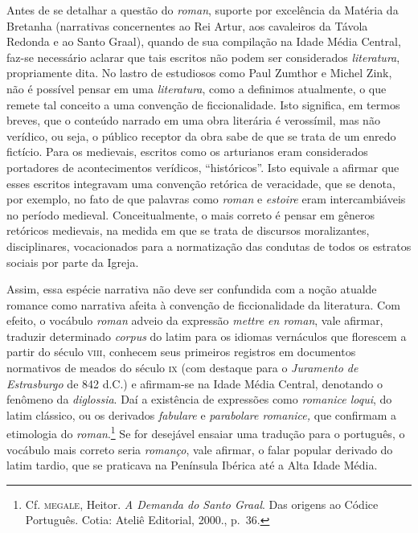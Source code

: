 Antes de se detalhar a questão do \textit{roman}, suporte por excelência
da Matéria da Bretanha (narrativas concernentes ao Rei Artur, aos
cavaleiros da Távola Redonda e ao Santo Graal), quando de sua
compilação na Idade Média Central, faz-se necessário aclarar que tais
escritos não podem ser considerados \textit{literatura}, propriamente
dita. No lastro de estudiosos como Paul Zumthor e Michel Zink, não é
possível pensar em uma \textit{literatura}, como a definimos
atualmente, o que remete tal conceito a uma convenção de
ficcionalidade. Isto significa, em termos breves, que o conteúdo
narrado em uma obra literária é verossímil, mas não verídico, ou seja,
o público receptor da obra sabe de que se trata de um enredo fictício.
Para os medievais, escritos como os arturianos eram considerados
portadores de acontecimentos verídicos, “históricos”. Isto equivale a
afirmar que esses escritos integravam uma convenção retórica de
veracidade, que se denota, por exemplo, no fato de que palavras como
\textit{roman} e \textit{estoire} eram intercambiáveis no período
medieval. Conceitualmente, o mais correto é pensar em gêneros retóricos
medievais, na medida em que se trata de discursos moralizantes,
disciplinares, vocacionados para a normatização das condutas de todos
os estratos sociais por parte da Igreja. 

Assim, essa espécie narrativa não deve ser confundida com a noção
atualde romance como narrativa afeita à convenção de ficcionalidade da
literatura. Com efeito, o vocábulo \textit{roman} adveio da expressão
\textit{mettre en roman}, vale afirmar, traduzir determinado
\textit{corpus} do latim para os idiomas vernáculos que florescem a
partir do século \textsc{viii}, conhecem seus primeiros registros em documentos
normativos de meados do século \textsc{ix} (com destaque para o
\textit{Juramento de Estrasburgo} de 842 d.C.) e afirmam-se na Idade
Média Central, denotando o fenômeno da \textit{diglossia}. Daí a
existência de expressões como \textit{romanice loqui}, do latim
clássico, ou os derivados \textit{fabulare} e \textit{parabolare
romanice,} que confirmam a etimologia do \textit{roman}.\footnote{ Cf.
\textsc{megale}, Heitor.\textit{ A Demanda do Santo Graal}. Das origens ao
Códice Português. Cotia: Ateliê Editorial, 2000., p.~36.} Se for
desejável ensaiar uma tradução para o português, o vocábulo mais
correto seria \textit{romanço}, vale afirmar, o falar popular derivado
do latim tardio, que se praticava na Península Ibérica até a Alta Idade
Média. 

